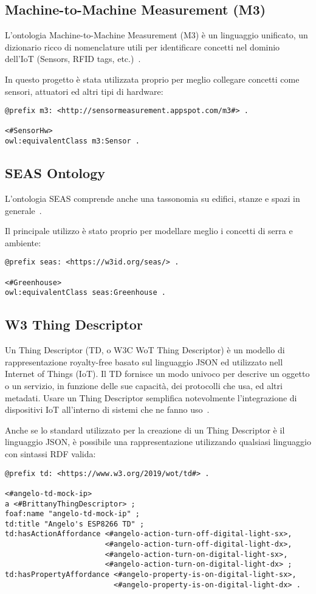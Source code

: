 \subsection{Machine-to-Machine Measurement (M3)}
L'ontologia Machine-to-Machine Measurement (M3) è un linguaggio unificato, un dizionario ricco di nomenclature utili per identificare concetti nel dominio dell'IoT (Sensors, RFID tags, etc.)~\cite{SWoTSema18:online}.

\noindent In questo progetto è stata utilizzata proprio per meglio collegare concetti come sensori, attuatori ed altri tipi di hardware:

\begin{verbatim}
@prefix m3: <http://sensormeasurement.appspot.com/m3#> .

<#SensorHw>
owl:equivalentClass m3:Sensor .
\end{verbatim}

\subsection{SEAS Ontology}
L'ontologia SEAS comprende anche una tassonomia su edifici, stanze e spazi in generale~\cite{SEAS:online}.

\noindent Il principale utilizzo è stato proprio per modellare meglio i concetti di serra e ambiente:

\begin{verbatim}
@prefix seas: <https://w3id.org/seas/> .

<#Greenhouse>
owl:equivalentClass seas:Greenhouse .
\end{verbatim}

\subsection{W3 Thing Descriptor}
Un Thing Descriptor (TD, o W3C WoT Thing Descriptor) è un modello di rappresentazione royalty-free basato sul linguaggio JSON ed utilizzato nell Internet of Things (IoT). Il TD fornisce un modo univoco per descrive un oggetto o un servizio, in funzione delle sue capacità, dei protocolli che usa, ed altri metadati. Usare un Thing Descriptor semplifica notevolmente l’integrazione di dispositivi IoT all’interno di sistemi che ne fanno uso~\cite{ThingDes54:online}.

\noindent Anche se lo standard utilizzato per la creazione di un Thing Descriptor è il linguaggio JSON, è possibile una rappresentazione utilizzando qualsiasi linguaggio con sintassi RDF valida:
\begin{verbatim}
@prefix td: <https://www.w3.org/2019/wot/td#> .

<#angelo-td-mock-ip>
a <#BrittanyThingDescriptor> ;
foaf:name "angelo-td-mock-ip" ;
td:title "Angelo's ESP8266 TD" ;
td:hasActionAffordance <#angelo-action-turn-off-digital-light-sx>,
                       <#angelo-action-turn-off-digital-light-dx>,
                       <#angelo-action-turn-on-digital-light-sx>,
                       <#angelo-action-turn-on-digital-light-dx> ;
td:hasPropertyAffordance <#angelo-property-is-on-digital-light-sx>,
                         <#angelo-property-is-on-digital-light-dx> .
\end{verbatim}
